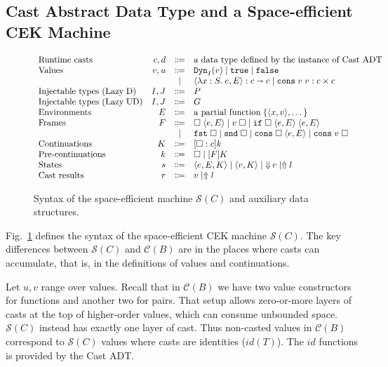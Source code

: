 \documentclass[runningheads]{llncs}
\newcommand{\stxrule}[3]{\text{#2} & #1 & \Coloneqq & #3\\}
\newcommand{\stxrulecont}[1]{& & | & #1 \\}
\newcommand{\figref}[1]{Fig.~\ref{#1}}
\newcommand{\LUD}{\ensuremath{\text{Lazy\;UD}}}
\newcommand{\LD}{\ensuremath{\text{Lazy\;D}}}
\newcommand{\CMachine}[1]{\ensuremath{\mathcal{C}(#1)}}
\newcommand{\SMachine}[1]{\ensuremath{\mathcal{S}(#1)}}
\newcommand{\error}[1]{\ensuremath{\Uparrow#1}}
\newcommand{\Pfunc}[2]{\ensuremath{#1 \shortrightarrow #2}}
\newcommand{\Pprod}[2]{\ensuremath{#1 \times #2}}
\newcommand{\elam}[3]{\lambda#1:#2.\;#3}
\newcommand{\eapp}[2]{#1\;#2}
\newcommand{\eif}[3]{\mathtt{if}\;#1\;#2\;#3}
\newcommand{\econs}[2]{\mathtt{cons} \; #1 \; #2}
\newcommand{\efst}[1]{\mathtt{fst} \; #1}
\newcommand{\esnd}[1]{\mathtt{snd} \; #1}
\newcommand{\ecast}[2]{\ensuremath{#1 : #2}}
\newcommand{\vdyn}[2]{\mathtt{Dyn}_{#1}(#2)}
\newcommand{\vtrue}[0]{\mathtt{true}}
\newcommand{\vfalse}[0]{\mathtt{false}}
\newcommand{\vfunc}[4]{\langle\elam{#1}{#2}{#3},#4\rangle}
\newcommand{\vcons}[2]{\econs{#1}{#2}}
\newcommand{\sexpr}[3]{\ensuremath{\langle#1,#2,#3\rangle}}
\newcommand{\scont}[2]{\ensuremath{\langle#1,#2\rangle}}
\newcommand{\shalt}[1]{\ensuremath{\mathop{\Downarrow} #1}}
\newcommand{\Knil}[0]{\Box}
\newcommand{\Kcons}[2]{[#1]#2}
\newcommand{\closure}[2]{\langle#1,#2\rangle}
\newcommand{\FappXO}[2]{\eapp{\square}{\closure{#1}{#2}}}
\newcommand{\FappOX}[1]{\eapp{#1}{\square}}
\newcommand{\Fif}[3]{\eif{\square}{\closure{#1}{#3}}{\closure{#2}{#3}}}
\newcommand{\FconsXO}[2]{\econs{\square}{\closure{#1}{#2}}}
\newcommand{\FconsOX}[1]{\econs{#1}{\square}}
\newcommand{\Ffst}[0]{\efst{\square}}
\newcommand{\Fsnd}[0]{\esnd{\square}}
\newcommand{\Fcast}[1]{\ecast{\square}{#1}}
\begin{document}
\subsection{Cast Abstract Data Type and a Space-efficient CEK Machine}
\label{sec:cast-adt-and-space-efficient-cek}

\begin{figure}[tp]
	\[
	\begin{array}{lrcl}
	\stxrule{c,d}{Runtime casts}{\text{a data type defined by the 
	instance of Cast ADT}}
	\stxrule{v,u}{Values}{
		\vdyn{I}{v}  \mid
		\vtrue       \mid
		\vfalse                     
	}
	\stxrulecont{
		\ecast{\vfunc{x}{S}{e}{E}}{\Pfunc{c}{c}} \mid
		\ecast{\vcons{v}{v}}{\Pprod{c}{c}}
	}
	\stxrule{I,J}{Injectable types (\LD)}{P}
	\stxrule{I,J}{Injectable types (\LUD)}{G}
	\stxrule{E}{Environments}{
		\text{a partial function}\;\{\langle x , v \rangle , \dots \}
	}
	\stxrule{F}{Frames}{
		\FappXO{e}{E}  \mid
		\FappOX{v}     \mid
		\Fif{e}{e}{E}
	}
	\stxrulecont{
		\Ffst \mid
		\Fsnd \mid
		\FconsXO{e}{E}  \mid
		\FconsOX{v}
	}
	\stxrule{K}{Continuations}{
		\Kcons{\Fcast{c}}{k}
	}
	\stxrule{k}{Pre-continuations}{
		\Knil         \mid
		\Kcons{F}{K}
	}
	\stxrule{s}{States}{
		\sexpr{e}{E}{K}  \mid
		\scont{v}{K}     \mid
		\shalt{v}        \mid
		\error{l}
	}
	\stxrule{r}{Cast results}{
		v \mid
		\error{l}
	}
	\end{array}
	\]
	
	\caption{Syntax of the space-efficient machine \SMachine{C} and auxiliary 
	data structures.}
	\label{fig:SEMachine-state}
\end{figure}

\figref{fig:SEMachine-state} defines the syntax of the space-efficient
CEK machine \SMachine{C}.  The key differences between \SMachine{C}
and \CMachine{B} are in the places where casts can accumulate, that
is, in the definitions of values and continuations.

Let $u,v$ range over values.
%
Recall that in \CMachine{B} we have two value constructors for
functions and another two for pairs. That setup allows zero-or-more
layers of casts at the top of higher-order values, which can consume
unbounded space.
%
\SMachine{C} instead has exactly one layer of cast.
Thus non-casted values in \CMachine{B} correspond to \SMachine{C} values
where casts are identities ($\mathit{id}(T)$). The 
$\mathit{id}$ functions is provided by the Cast ADT.
\end{document}
